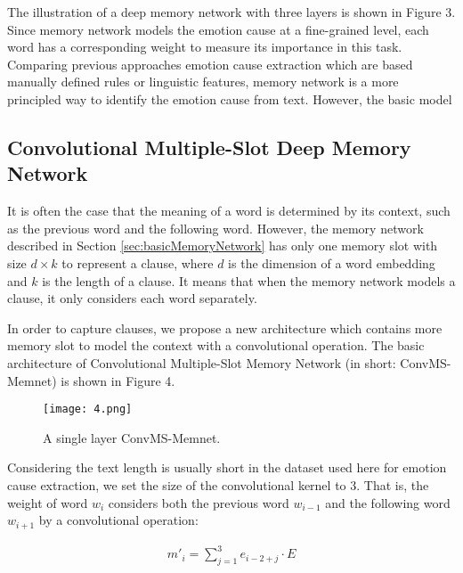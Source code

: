 \documentclass[11pt,letterpaper]{article}
\begin{document}
\begin{CJK*}{UTF8}{gbsn}
The illustration of a deep memory network with three layers is shown in Figure 3. Since  memory network models the emotion cause 
at a fine-grained level, each word has a corresponding weight to measure 
its importance in this task. Comparing  previous approaches  emotion cause extraction which are  based  manually defined rules or linguistic features,  memory network is a more principled way to identify the emotion cause from text. However, the basic  model 


\subsection{Convolutional Multiple-Slot Deep Memory Network}
\label{sec:multislots}

It is often the case that the meaning of a word is determined by its context, such as the previous word and the following word.  However, the memory network described in Section \ref{sec:basicMemoryNetwork} has only one memory slot with size $d \times k$ to represent a clause, where $d$ is the dimension of a word embedding and $k$ is the length of a clause. It means that when the memory network models a clause, it only considers each word separately. 


In order to capture  clauses, we propose a new architecture which contains more memory slot to model the context with a convolutional operation. The basic architecture of Convolutional Multiple-Slot Memory Network (in short: ConvMS-Memnet) is shown in Figure 4.

\begin{figure}[htbp]
\label{fig:figure4}
\centering
\texttt{[image: 4.png]}
\caption{A single layer ConvMS-Memnet.}
\end{figure}

Considering the text length is usually short in the dataset used here for emotion cause extraction, we set the size of the convolutional kernel to 3. That is, the weight of word $w_i$  considers both the previous word $w_{i-1}$ and the following word $w_{i+1}$ by a convolutional operation:


\begin{align}
m'_i = \sum^{3}_{j=1} e_{i-2+j} \cdot E
\end{align}



\end{CJK*}
\end{document}
